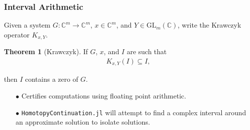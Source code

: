 \documentclass{beamer}
\theoremstyle{definition}
\newtheorem{thm}{Theorem}
\begin{document}
\begin{frame}
\frametitle{Interval Arithmetic}
Given a system $G:\mathbb{C}^m\to\mathbb{C}^m$, $x\in\mathbb{C}^m$, and $Y\in\text{GL}_m(\mathbb{C})$, write the Krawczyk operator $K_{x,Y}$.

\begin{thm}[Krawczyk]
\vspace{-.1cm}
If $G$, $x$, and $I$ are such that 
\vspace{-.3cm}
\begin{align*}
K_{x,Y}(I)\subseteq I,
\end{align*}
\vspace{-.85cm} 

then $I$ contains a zero of $G$.
\end{thm}

\begin{enumerate}
\item[$\bullet$] Certifies computations using floating point arithmetic.

\item[$\bullet$] \texttt{HomotopyContinuation.jl} will attempt to find a complex interval around an approximate solution to isolate solutions.
\end{enumerate}
\end{frame}
\end{document}
